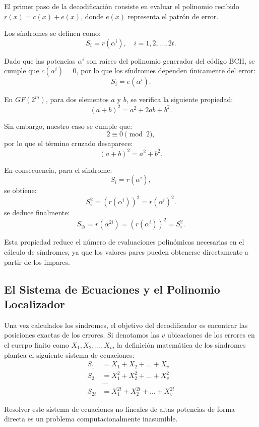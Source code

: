 El primer paso de la decodificación consiste en evaluar el polinomio recibido \(r(x) = c(x) + e(x)\), donde \(e(x)\) representa el patrón de error.

Los síndromes se definen como:
\begin{equation}
S_i = r(\alpha^i), \quad i = 1, 2, \dots, 2t.
\end{equation}

Dado que las potencias \(\alpha^i\) son raíces del polinomio generador del código BCH, se cumple que \(c(\alpha^i)=0\), por lo que los síndromes dependen únicamente del error:
\[
S_i = e(\alpha^i).
\]

En \(GF(2^m)\), para dos elementos \(a\) y \(b\), se verifica la siguiente propiedad:
\[
(a + b)^2 = a^2 + 2ab + b^2.
\]

Sin embargo, nuestro caso se cumple que:
\[
2 \equiv 0 \pmod{2},
\]
por lo que el término cruzado desaparece:
\[
(a + b)^2 = a^2 + b^2.
\]

En consecuencia, para el síndrome:
\[
S_i = r(\alpha^i),
\]
se obtiene:
\[
S_i^2 = (r(\alpha^i))^2 = r(\alpha^i)^2.
\]
se deduce finalmente:
\[
S_{2i} = r(\alpha^{2i}) = (r(\alpha^i))^2 = S_i^2.
\]

Esta propiedad reduce el número de evaluaciones polinómicas necesarias en el cálculo de síndromes, ya que los valores pares pueden obtenerse directamente a partir de los impares.

\subsection{El Sistema de Ecuaciones y el Polinomio Localizador}

Una vez calculados los síndromes, el objetivo del decodificador es encontrar las posiciones exactas de los errores. Si denotamos las $v$ ubicaciones de los errores en el cuerpo finito como $X_1, X_2, \dots, X_v$, la definición matemática de los síndromes plantea el siguiente sistema de ecuaciones:
\begin{align*}
S_1 &= X_1 + X_2 + \dots + X_v \\
S_2 &= X_1^2 + X_2^2 + \dots + X_v^2 \\
&\dots \\
S_{2t} &= X_1^{2t} + X_2^{2t} + \dots + X_v^{2t}
\end{align*}

Resolver este sistema de ecuaciones no lineales de altas potencias de forma directa es un problema computacionalmente inasumible. 

